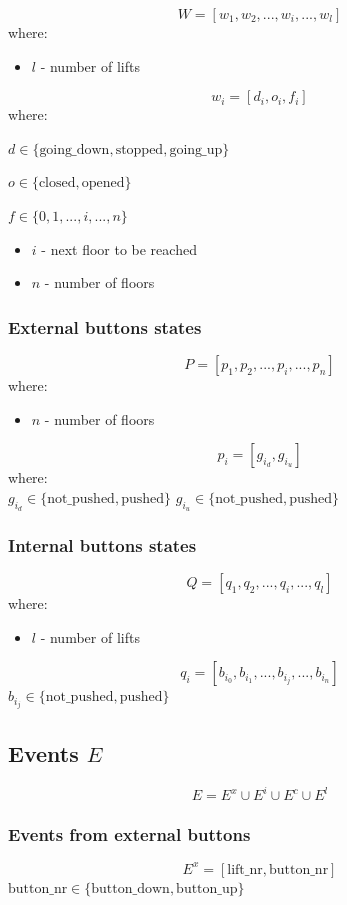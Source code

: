 \documentclass[12pt]{article}
\begin{document}
\[ W=[w_1, w_2, ..., w_i, ..., w_l ]\]
where:
\begin{itemize}
  \item \(l\) - number of lifts
\end{itemize}

\[ w_i = [d_i, o_i, f_i] \]
where:

\(d \in \{\text{going\_down},\text{stopped},\text{going\_up}\}\)

\(o \in \{\text{closed},\text{opened}\}\)

\(f \in \{0,1,...,i,...,n\}\)
\begin{itemize}
  \item \(i\) - next floor to be reached
  \item \(n\) - number of floors
\end{itemize}


\subsubsection{External buttons states}

\[ P = [p_1, p_2, ..., p_i, ..., p_n] \]
where:
\begin{itemize}
  \item \(n\) - number of floors
\end{itemize}

\[ p_i = [g_{i_d}, g_{i_u}] \]
where:\\
\(g_{i_d} \in \{\text{not\_pushed},\text{pushed}\}\)
\(g_{i_u} \in \{\text{not\_pushed},\text{pushed}\}\)\\


\subsubsection{Internal buttons states}
\[ Q = [q_1, q_2, ..., q_i, ..., q_l] \]
where:
\begin{itemize}
  \item \(l\) - number of lifts
\end{itemize}
\[q_i = [b_{i_0}, b_{i_1}, ..., b_{i_j}, ..., b_{i_n}] \]
\(b_{i_j} \in \{\text{not\_pushed},\text{pushed}\} \)

\newpage

\subsection{Events \(E\)}

\[ E = E^x \cup E^i \cup E^c \cup E^l \]

\subsubsection{Events from external buttons}
\[ E^x = [\text{lift\_nr},\text{button\_nr}] \]
\(\text{button\_nr} \in \{\text{button\_down},\text{button\_up}\}\)
\end{document}
